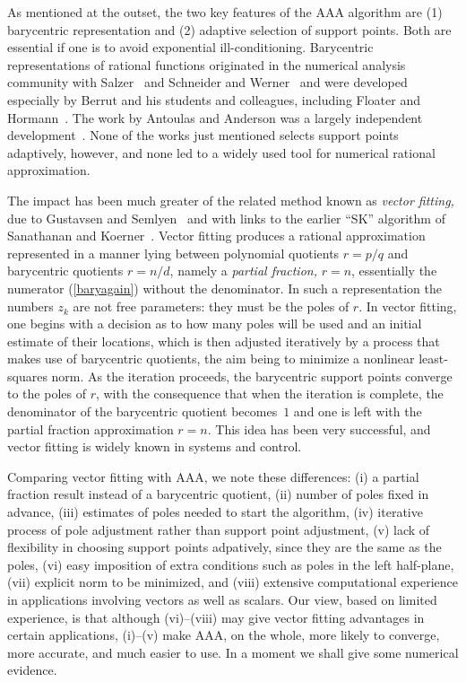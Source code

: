 \documentclass[final]{siamltex}
\begin{document}
As mentioned at the outset, the two key features of the
AAA algorithm are (1) barycentric representation and (2)
adaptive selection of support points.  Both are essential if
one is to avoid exponential ill-conditioning.  Barycentric
representations of rational functions originated in the
numerical analysis community with Salzer~\cite{salzer} and Schneider
and Werner~\cite{sw} and were developed especially
by Berrut and his students and colleagues, including
Floater and Hormann~\cite{berrut,berrut00,bbm,bt,fh,klein}.
The work by Antoulas and Anderson was a largely independent
development~\cite{antoulas,aa,ionita}.  None of the works just
mentioned selects support points adaptively, however, and none
led to a widely used tool for numerical rational approximation.

The impact has been much greater of the related method known as {\em
vector fitting,} due to Gustavsen and Semlyen~\cite{gust,gs,hd} and
with links to the earlier ``SK'' algorithm of Sanathanan and Koerner~\cite{sk}.
Vector fitting produces a rational approximation represented
in a manner lying between polynomial quotients $r = p/q$ and
barycentric quotients $r = n/d$, namely a {\em partial fraction,}
$r = n$, essentially the numerator (\ref{baryagain}) without
the denominator.  In such a representation the numbers $z_k^{}$
are not free parameters: they must be the poles of $r$.  In vector
fitting, one begins with a decision as to how many poles will be
used and an initial estimate of their locations, which is then
adjusted iteratively by a process that makes
use of barycentric quotients, the aim being to minimize a nonlinear
least-squares norm.  As the iteration proceeds, the barycentric
support points converge to the poles of $r$, with the consequence
that when the iteration is complete, the denominator of the barycentric
quotient becomes~$1$ and 
one is left with the partial fraction approximation $r = n$.
This idea has been very successful, and vector fitting is widely
known in systems and control.

Comparing vector fitting with AAA, we note these differences: (i)
a partial fraction result instead of a barycentric quotient, (ii)
number of poles fixed in advance, (iii) estimates of poles needed
to start the algorithm, (iv) iterative process of pole adjustment
rather than support point adjustment,
(v) lack of flexibility in choosing support points adpatively,
since they are the same as the poles, (vi) easy imposition of
extra conditions such as poles in the left half-plane, (vii)
explicit norm to be minimized, and (viii)
extensive computational experience in applications involving
vectors as well as scalars.  Our view, based on limited experience,
is that although (vi)--(viii) may give vector fitting advantages in certain
applications, (i)--(v) make AAA, on the whole,
more likely to converge, more accurate, and much
easier to use.  In a moment we shall give some numerical evidence.
\end{document}
